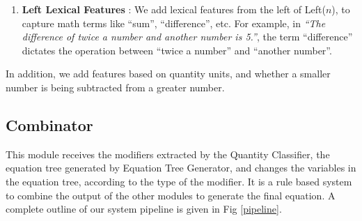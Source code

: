 \begin{enumerate}
\begin{enumerate}
            \item \textbf{Left Lexical Features} : We add lexical
              features from the left of Left($n$), to capture math
              terms like ``sum'', ``difference'', etc. For example, in
              {\em``The difference of twice a number and another
                number is 5.''}, the term ``difference'' dictates the
              operation between ``twice a number'' and ``another
              number''.  
          \end{enumerate}
          In addition, we add features based on quantity units, and
          whether a smaller number is being subtracted from a greater
          number.
      \end{enumerate}  

    \subsection{Combinator}
      This module receives the modifiers extracted by the Quantity Classifier,
      the equation tree generated by Equation Tree Generator, and changes the
      variables in the equation tree, according to the type of the modifier.
      It is a rule based system to combine the output of the other modules to
      generate the final equation. A complete outline of our system pipeline
      is given in Fig \ref{pipeline}.


      
      


    
    





